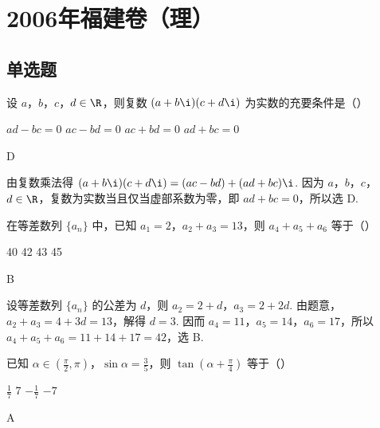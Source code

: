 \chapter{2006年福建卷（理）}
\section{单选题}
\begin{problem}
设 \(a\)，\(b\)，\(c\)，\(d\in\R\)，则复数 \((a + b\i)(c + d\i)\) 为实数的充要条件是（\quad）

\choices
    {\(ad - bc = 0\)}
    {\(ac - bd = 0\)}
    {\(ac + bd = 0\)}
    {\(ad + bc = 0\)}
\end{problem}

\begin{answer}
D
\end{answer}

\begin{solution}
由复数乘法得 \((a+b\i)(c+d\i)=(ac-bd)+(ad+bc)\i\). 因为 \(a\)，\(b\)，\(c\)，\(d\in\R\)，复数为实数当且仅当虚部系数为零，即 \(ad+bc=0\)，所以选 D.
\end{solution}

\begin{problem}
在等差数列 \(\{a_{n}\}\) 中，已知 \(a_1 = 2\)，\(a_2 + a_3 = 13\)，则 \(a_4 + a_5 + a_6\) 等于（\quad）

\choices
    {40}
    {42}
    {43}
    {45}
\end{problem}

\begin{answer}
B
\end{answer}

\begin{solution}
设等差数列 \(\{a_n\}\) 的公差为 \(d\)，则 \(a_2=2+d\)，\(a_3=2+2d\). 由题意，\(a_2+a_3=4+3d=13\)，解得 \(d=3\). 因而 \(a_4=11\)，\(a_5=14\)，\(a_6=17\)，所以 \(a_4+a_5+a_6=11+14+17=42\)，选 B.
\end{solution}

\begin{problem}
已知 \(\alpha \in \left(\frac{\pi}{2}, \pi\right)\)，\(\sin \alpha = \frac{3}{5}\)，则 \(\tan \left(\alpha + \frac{\pi}{4}\right)\) 等于（\quad）

\choices
    {\( \frac{1}{7} \)}
    {7}
    {\(-\frac{1}{7}\)}
    {\(-7\)}
\end{problem}

\begin{answer}
A
\end{answer}

